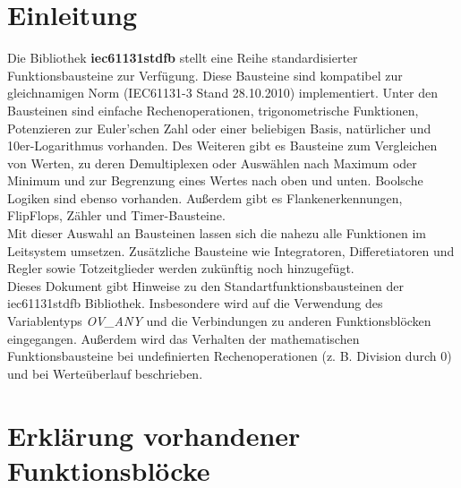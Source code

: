 \chapter{Einleitung}

Die Bibliothek \textbf{iec61131stdfb} stellt eine Reihe standardisierter Funktionsbausteine zur Verfügung. Diese Bausteine sind kompatibel zur gleichnamigen Norm (IEC61131-3 Stand 28.10.2010) implementiert. Unter den Bausteinen sind einfache Rechenoperationen, trigonometrische Funktionen, Potenzieren zur Euler'schen Zahl oder einer beliebigen Basis, natürlicher und 10er-Logarithmus vorhanden. Des Weiteren gibt es Bausteine zum Vergleichen von Werten, zu deren Demultiplexen oder Auswählen nach Maximum oder Minimum und zur Begrenzung eines Wertes nach oben und unten. Boolsche Logiken sind ebenso vorhanden. Außerdem gibt es Flankenerkennungen, FlipFlops, Zähler und Timer-Bausteine.\\
Mit dieser Auswahl an Bausteinen lassen sich die nahezu alle Funktionen im Leitsystem umsetzen. Zusätzliche Bausteine wie Integratoren, Differetiatoren und Regler sowie Totzeitglieder werden zukünftig noch hinzugefügt.\\

Dieses Dokument gibt Hinweise zu den Standartfunktionsbausteinen der iec61131stdfb Bibliothek. Insbesondere wird auf die Verwendung des Variablentyps \textit{OV\_ANY} und die Verbindungen zu anderen Funktionsblöcken eingegangen. Außerdem wird das Verhalten der mathematischen Funktionsbausteine bei undefinierten Rechenoperationen (z. B. Division durch 0) und bei Werteüberlauf beschrieben.\\






\chapter{Erklärung vorhandener Funktionsblöcke}

